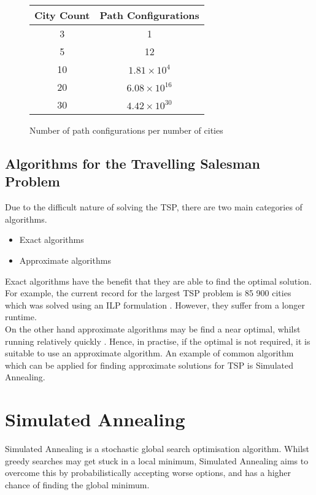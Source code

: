 \documentclass{article}
\begin{document}
\begin{figure}[h]
    \centering
    \begin{tabular}{ |c|c| } 
        \hline
        City Count & Path Configurations \\ 
        \hline
        3 & 1 \\
        \hline
        5 & 12 \\
        \hline
        10 & $1.81 \times 10^{4}$ \\ 
        \hline
        20 & $6.08 \times 10^{16}$ \\
        \hline
        30 & $4.42 \times 10^{30}$ \\
        \hline
    \end{tabular}
    \caption{Number of path configurations per number of cities}
\end{figure}

\subsection{Algorithms for the Travelling Salesman Problem}

Due to the difficult nature of solving the TSP, there are two main categories of algorithms.

\begin{itemize}
    \item Exact algorithms
    \item Approximate algorithms
\end{itemize}

Exact algorithms have the benefit that they are able to find the optimal solution.
For example, the current record for the largest TSP problem is 85 900 cities which was solved using an ILP formulation \cite{cook12}.
However, they suffer from a longer runtime. \\

On the other hand approximate algorithms may be find a near optimal, whilst running relatively quickly \cite{helsgaun98}.
Hence, in practise, if the optimal is not required, it is suitable to use an approximate algorithm.
An example of common algorithm which can be applied for finding approximate solutions for TSP is Simulated Annealing.

\newpage
\section{Simulated Annealing}
Simulated Annealing is a stochastic global search optimisation algorithm.
Whilst greedy searches may get stuck in a local minimum, Simulated Annealing aims to overcome this by probabilistically accepting worse options, and has a higher chance of finding the global minimum.
\\
\end{document}
